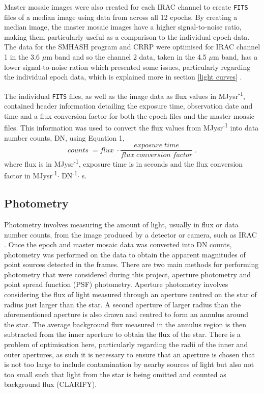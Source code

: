\documentclass[11pt]{iopart}
\begin{document}
Master mosaic images were also created for each IRAC channel to create \verb"FITS" files of a median image using data from across all 12 epochs. By creating a median image, the master mosaic images have a higher signal-to-noise ratio, making them particularly useful as a comparison to the individual epoch data. The data for the SMHASH program and CRRP were optimised for IRAC channel 1 in the 3.6 $\mu$m band and so the channel 2 data, taken in the 4.5 $\mu$m band, has a lower signal-to-noise ration which presented some issues, particularly regarding the individual epoch data, which is explained more in section \ref{light curves} \cite{garofalo2018smhash}.

The individual \verb"FITS" files, as well as the image data as flux values in MJysr\textsuperscript{-1},  contained header information detailing the exposure time, observation date and time and a flux conversion factor for both the epoch files and the master moasic files. This information was used to convert the flux values from MJysr\textsuperscript{-1} into data number counts, DN, using Equation 1,
\begin{equation}
\label{eq:conv}
    counts\;=flux\;\cdot \frac{exposure\;time}{flux\;conversion\;factor}\;.
\end{equation}
where flux is in MJysr\textsuperscript{-1}, exposure time is in seconds and the flux conversion factor in MJysr\textsuperscript{-1}$\cdot$ DN\textsuperscript{-1}$\cdot$ s.

\subsection{Photometry}
\label{photometry}

Photometry involves measuring the amount of light, usually in flux or data number counts, from the image produced by a detector or camera, such as IRAC \cite{ccdastron}. Once the epoch and master mosaic data was converted into DN counts, photometry was performed on the data to obtain the apparent magnitudes of point sources detected in the frames. There are two main methods for performing photometry that were considered during this project, aperture photometry and point spread function (PSF) photometry. Aperture photometry involves considering the flux of light measured through an aperture centred on the star of radius just larger than the star. A second aperture of larger radius than the aforementioned aperture is also drawn and centred to form an annulus around the star. The average background flux measured in the annulus region is then subtracted from the inner aperture to obtain the flux of the star. There is a problem of optimisation here, particularly regarding the radii of the inner and outer apertures, as such it is necessary to ensure that an aperture is chosen that is not too large to include contamination by nearby sources of light but also not too small such that light from the star is being omitted and counted as background flux (CLARIFY). 
\end{document}
